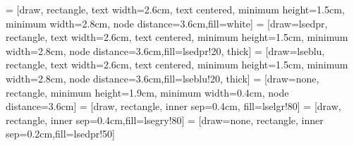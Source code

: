 \documentclass[11pt,twoside,openright,showframe]{report}
\begin{document}
 = [draw, rectangle, text width=2.6cm, text centered, minimum height=1.5cm, minimum width=2.8cm, node distance=3.6cm,fill=white]
 = [draw=lsedpr, rectangle, text width=2.6cm, text centered, minimum height=1.5cm, minimum width=2.8cm, node distance=3.6cm,fill=lsedpr!20, thick]
 = [draw=lseblu, rectangle, text width=2.6cm, text centered, minimum height=1.5cm, minimum width=2.8cm, node distance=3.6cm,fill=lseblu!20, thick]
 = [draw=none, rectangle, minimum height=1.9cm, minimum width=0.4cm, node distance=3.6cm]
 = [draw, rectangle, inner sep=0.4cm, fill=lselgr!80]
 = [draw, rectangle, inner sep=0.4cm,fill=lsegry!80]
 = [draw=none, rectangle, inner sep=0.2cm,fill=lsedpr!50]

\def\bottom#1#2{\hbox{\vbox to #1{\vfill\hbox{#2}}}}
\end{document}

